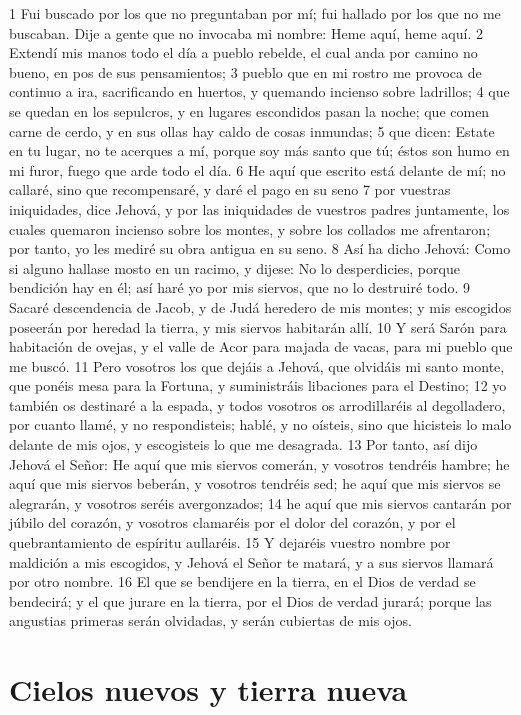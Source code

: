 1 Fui buscado por los que no preguntaban por mí; fui hallado por los que no me buscaban. Dije a gente que no invocaba mi nombre: Heme aquí, heme aquí.
2 Extendí mis manos todo el día a pueblo rebelde, el cual anda por camino no bueno, en pos de sus pensamientos;
3 pueblo que en mi rostro me provoca de continuo a ira, sacrificando en huertos, y quemando incienso sobre ladrillos;
4 que se quedan en los sepulcros, y en lugares escondidos pasan la noche; que comen carne de cerdo, y en sus ollas hay caldo de cosas inmundas;
5 que dicen: Estate en tu lugar, no te acerques a mí, porque soy más santo que tú; éstos son humo en mi furor, fuego que arde todo el día.
6 He aquí que escrito está delante de mí; no callaré, sino que recompensaré, y daré el pago en su seno
7 por vuestras iniquidades, dice Jehová, y por las iniquidades de vuestros padres juntamente, los cuales quemaron incienso sobre los montes, y sobre los collados me afrentaron; por tanto, yo les mediré su obra antigua en su seno.
8 Así ha dicho Jehová: Como si alguno hallase mosto en un racimo, y dijese: No lo desperdicies, porque bendición hay en él; así haré yo por mis siervos, que no lo destruiré todo.
9 Sacaré descendencia de Jacob, y de Judá heredero de mis montes; y mis escogidos poseerán por heredad la tierra, y mis siervos habitarán allí.
10 Y será Sarón para habitación de ovejas, y el valle de Acor para majada de vacas, para mi pueblo que me buscó.
11 Pero vosotros los que dejáis a Jehová, que olvidáis mi santo monte, que ponéis mesa para la Fortuna, y suministráis libaciones para el Destino;
12 yo también os destinaré a la espada, y todos vosotros os arrodillaréis al degolladero, por cuanto llamé, y no respondisteis; hablé, y no oísteis, sino que hicisteis lo malo delante de mis ojos, y escogisteis lo que me desagrada.
13 Por tanto, así dijo Jehová el Señor: He aquí que mis siervos comerán, y vosotros tendréis hambre; he aquí que mis siervos beberán, y vosotros tendréis sed; he aquí que mis siervos se alegrarán, y vosotros seréis avergonzados;
14 he aquí que mis siervos cantarán por júbilo del corazón, y vosotros clamaréis por el dolor del corazón, y por el quebrantamiento de espíritu aullaréis.
15 Y dejaréis vuestro nombre por maldición a mis escogidos, y Jehová el Señor te matará, y a sus siervos llamará por otro nombre.
16 El que se bendijere en la tierra, en el Dios de verdad se bendecirá; y el que jurare en la tierra, por el Dios de verdad jurará; porque las angustias primeras serán olvidadas, y serán cubiertas de mis ojos.

\section*{Cielos nuevos y tierra nueva}

